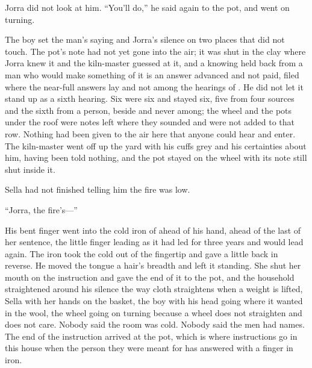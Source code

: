 Jorra did not look at him. “You'll do,” he said again to the pot, and went on turning.

The boy set the man's saying and Jorra's silence on two places that did not touch. The pot's note had not yet gone into the air; it was shut in the clay where Jorra knew it and the kiln-master guessed at it, and a knowing held back from a man who would make something of it is an answer advanced and not paid, filed where the near-full answers lay and not among the hearings of . He did not let it stand up as a sixth hearing. Six were six and stayed six, five from four sources and the sixth from a person, beside and never among; the wheel and the pots under the roof were notes left where they sounded and were not added to that row. Nothing had been given to the air here that anyone could hear and enter. The kiln-master went off up the yard with his cuffs grey and his certainties about him, having been told nothing, and the pot stayed on the wheel with its note still shut inside it.

Sella had not finished telling him the fire was low.

“Jorra, the fire's—”

His bent finger went into the cold iron of  ahead of his hand, ahead of the last of her sentence, the little finger leading as it had led for three years and would lead again. The iron took the cold out of the fingertip and gave a little back in reverse. He moved the tongue a hair's breadth and left it standing. She shut her mouth on the instruction and gave the end of it to the pot, and the household straightened around his silence the way cloth straightens when a weight is lifted, Sella with her hands on the basket, the boy with his head going where it wanted in the wool, the wheel going on turning because a wheel does not straighten and does not care. Nobody said the room was cold. Nobody said the men had names. The end of the instruction arrived at the pot, which is where instructions go in this house when the person they were meant for has answered with a finger in iron.

